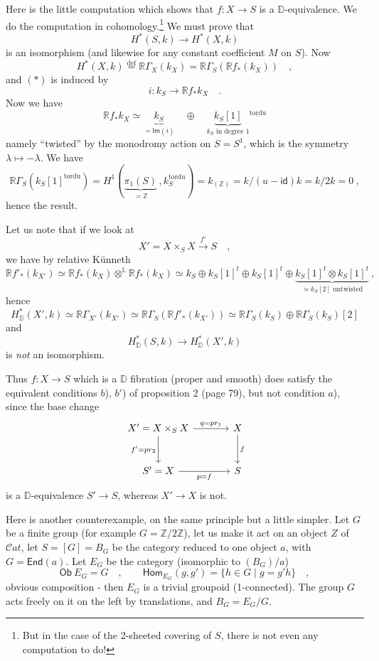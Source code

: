 \documentclass[11pt]{article}
\newcommand{\printedpage}[1]{\marginpar{\footnotesize p.~#1}}
\newcommand{\msp}[1]{\marginpar{\footnotesize [#1]}}
\newcommand{\Cat}{\mathcal{C}\mathit{at}}
\newcommand{\D}{\mathbb{D}}
\newcommand{\RR}{\mathbb{R}}
\begin{document}
\msp{page 89}
Here is the little computation which shows that $f : X \to S$ is a $\D$-equivalence. We do the computation in cohomology.\footnote[46]{But in the case of the 2-sheeted covering of $S$, there is not even any computation to do!} We must prove that
\[ H^*(S,k) \longrightarrow H^*(X,k) \tag*{$(*)$} \]
\printedpage{55}
is an isomorphism (and likewise for any constant coefficient $M$ on $S$). Now
\[ H^*(X,k) \overset{\mathrm{def}}{=} \RR\Gamma_X(k_X) = \RR\Gamma_S(\RR f_*(k_X)) \quad , \]
and $(*)$ is induced by
\[ i : k_S \longrightarrow \RR f_* k_X \quad . \]
Now we have
\[ \RR f_* k_X \simeq \underbrace{k_S}_{= \mathsf{Im}(i)} \quad \oplus \quad \underbrace{k_S[1]}_{k_S \text{ in degree } 1}{}^{\underline{\mathrm{tordu}}} \]
namely ``twisted'' by the monodromy action on $S = S^1$, which is the symmetry $\lambda \mapsto -\lambda$. We have
\[ \RR\Gamma_S(k_S[1]^{\mathrm{tordu}}) = H^1(\underbrace{\pi_1(S)}_{= \mathbb{Z}}\, , k_S^{\mathrm{tordu}}) = k_{(\mathbb{Z})} = k/(u - \mathsf{id})k = k/2k = 0 \ , \]
hence the result.

Let us note that if we look at
\[ X' = X \times_S X \xrightarrow{f'} S \quad , \]
we have by relative Künneth
\[ \RR f'_*(k_{X'}) \simeq \RR f_*(k_X) \otimes^{\mathbb{L}} \RR f_*(k_X) \simeq k_S \oplus k_S[1]^t \oplus k_S[1]^t \oplus \underbrace{k_S[1]^t \otimes k_S[1]^t}_{\simeq k_S[2] \text{ untwisted}} \ , \]
hence
\[ H^*_{\D}(X',k) \simeq \RR\Gamma_{X'}(k_{X'}) \simeq \RR\Gamma_S(\RR f'_*(k_{X'})) \simeq \RR\Gamma_S(k_S) \oplus \RR\Gamma_S(k_S)[2] \]
and
\[ H^*_{\D}(S,k) \longrightarrow H^*_{\D}(X',k) \]
is \textit{not} an isomorphism.

\msp{page 90}
Thus $f : X \to S$ which is a $\D$ fibration (proper and smooth) does satisfy the equivalent conditions $b$), $b'$) of proposition 2 (page 79), but not condition $a$), since the base change
\[
\begin{tikzcd}[column sep=large, row sep=large]
X' = X \times_S X \arrow[r, "{q = pr_1}"] \arrow[d, "{f' = pr_2}"'] & X \arrow[d, "f"] \\
S' = X \arrow[r, "{p = f}"'] & S
\end{tikzcd}
\]
is a $\D$-equivalence $S' \to S$, whereas $X' \to X$ is not.

Here is another counterexample, on the same principle but a little simpler. Let $G$ be a finite group (for example $G = \mathbb{Z}/2\mathbb{Z}$), let us make it act on an object $Z$ of $\Cat$, let $S = [G] = B_G$ be the category reduced to one object $a$, with $G = \mathsf{End}(a)$. Let $E_G$ be the category (isomorphic to $(B_G)/a$)
\[ \mathsf{Ob}\ E_G = G \quad , \qquad \mathsf{Hom}_{E_G}(g,g') = \{ h \in G \mid g = g'h \} \quad , \]
obvious composition - then $E_G$ is a trivial groupoid (1-connected). The group $G$ acts freely on it on the left by translations, and $B_G = E_G/G$. %
\end{document}
